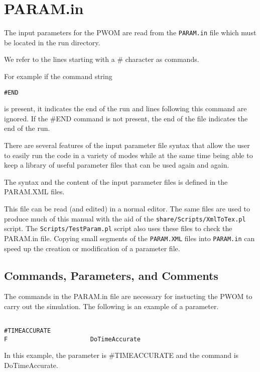 %

\section{PARAM.in \label{section:param.in}}

The input parameters for the PWOM are read from the 
{\tt PARAM.in} file which must be located in the run directory.

We refer to the lines starting with a \# character as commands.

For example if the command string 
\begin{verbatim}
#END
\end{verbatim}
is present, it indicates the end of the run and lines following
this command are ignored. If the \#END command is not
present, the end of the file indicates the end of the run.

There are several features of the input parameter file syntax
that allow the user to easily run the code
in a variety of modes while at the same time being able to 
keep a library of useful parameter files that can be used
again and again.

The syntax and the content of the input parameter files
is defined in the PARAM.XML files. 

This file can be read (and edited) in a normal editor.
The same files are used to produce much of this
manual with the aid of the {\tt share/Scripts/XmlToTex.pl} script. 
The {\tt Scripts/TestParam.pl} script also uses these files
to check the PARAM.in file.
Copying small segments of the {\tt PARAM.XML} files
into {\tt PARAM.in} can speed up the creation or modification of a 
parameter file. 

\subsection{Commands, Parameters, and Comments \label{section:commands}}

The commands in the PARAM.in file are necessary for instucting the PWOM 
to carry out the simulation. The following is an example of a parameter.
\begin{verbatim}

#TIMEACCURATE
F                       DoTimeAccurate

\end{verbatim}
In this example, the parameter is \#TIMEACCURATE and the command is 
DoTimeAccurate.
  
